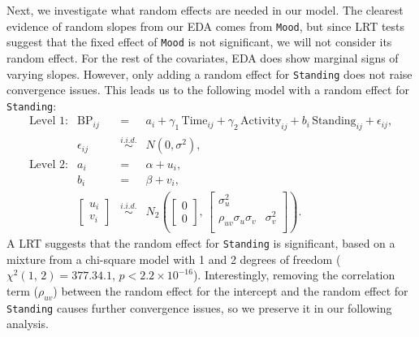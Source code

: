 \documentclass[12pt,twoside,letterpaper]{article}
\theoremstyle{definition}
\theoremstyle{definition}
\begin{document}
Next, we investigate what random effects are needed in our model. The clearest evidence of random slopes from our EDA comes from \texttt{Mood}, but since LRT tests suggest that the fixed effect of \texttt{Mood} is not significant, we will not consider its random effect. For the rest of the covariates, EDA does show marginal signs of varying slopes. However, only adding a random effect for \texttt{Standing} does not raise convergence issues. This leads us to the following model with a random effect for \texttt{Standing}:
\begin{equation}\label{eq: RIS stand}
    \begin{array}{rrcll}
        \text{Level 1}: & \text{BP}_{ij} &=& a_i + \gamma_1\, \text{Time}_{ij} + \gamma_2\, \text{Activity}_{ij} + b_i\, \text{Standing}_{ij} + \epsilon_{ij}, \\[0.5ex]
         & \epsilon_{ij} &\overset{i.i.d.}{\sim}& N(0, \sigma^2), \\[0.5ex]
        \text{Level 2}: & a_i &=& \alpha + u_i, \\[0.5ex]
         & b_i &=& \beta + v_i, \\[1ex]
         & \begin{bmatrix} u_i \\ v_i 
         \end{bmatrix} &\overset{i.i.d.}{\sim}& N_2\left(\begin{bmatrix} 0 \\ 0 \end{bmatrix},\, \begin{bmatrix} \sigma_u^2 &\\ 
         \rho_{uv}\sigma_u\sigma_v & \sigma_v^2\\
         \end{bmatrix} \right).
    \end{array}
\end{equation}
A LRT suggests that the random effect for \texttt{Standing} is significant, based on a mixture from a chi-square model with 1 and 2 degrees of freedom ($\chi^2 (1,\, 2) = 377.34.1$, $p < 2.2 \times 10^{-16}$). Interestingly, removing the correlation term ($\rho_{uv}$) between the random effect for the intercept and the random effect for \texttt{Standing} causes further convergence issues, so we preserve it in our following analysis.
\end{document}
